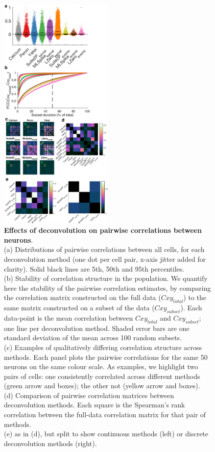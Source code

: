 \documentclass[a4paper,11pt]{article}
\begin{document}
\begin{figure}
	\centering
	\includegraphics[width=0.5\textwidth]{composite_figs/fig7_correlations}
	\caption {\label{fig:cxy_dist} \textbf{Effects of deconvolution on pairwise correlations between neurons}. \\ 
		(a) Distributions of pairwise correlations between all cells, for each deconvolution method (one dot per cell pair, x-axis jitter added for clarity). Solid black lines are 5th, 50th and 95th percentiles. \\
		(b) Stability of correlation structure in the population. We quantify here the stability of the pairwise correlation estimates, by comparing the correlation matrix constructed on the full data ($Cxy_{total}$) to the same matrix constructed on a subset of the data ($Cxy_{subset}$). Each data-point is the mean correlation between $Cxy_{total}$ and $Cxy_{subset}$; one line per deconvolution method. Shaded error bars are one standard deviation of the mean across 100 random subsets.\\
		(c) Examples of qualitatively differing correlation structure across methods. Each panel plots the pairwise correlations for the same 50 neurons on the same colour scale. As examples, we highlight two pairs of cells: one consistently correlated across different methods (green arrow and boxes); the other not (yellow arrow and boxes). \\
		(d) Comparison of pairwise correlation matrices between deconvolution methods. Each square is the Spearman's rank correlation between the full-data correlation matrix for that pair of methods. \\
		(e) as in (d), but split to show continuous methods (left) or discrete deconvolution methods (right).
	}
\end{figure}
 
\end{document}
